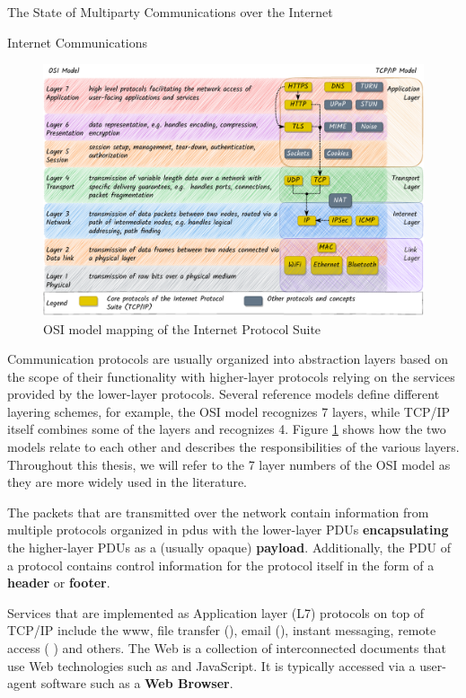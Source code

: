 \begin{frame}[fragile]{The State of Multiparty Communications over the Internet}
\begin{block}{Internet Communications}
\begin{figure}
\centering
\includegraphics[width=1\textwidth,height=\textheight]{thesis/../figures/osi-map-tcp.drawio.pdf}
\caption{OSI model mapping of the Internet Protocol Suite\label{osi-map-tcp}}
\end{figure}

Communication protocols are usually organized into abstraction layers based on the scope of their functionality with higher-layer protocols relying on the services provided by the lower-layer protocols. Several reference models define different layering schemes, for example, the OSI model recognizes 7 layers, while TCP/IP itself combines some of the layers and recognizes 4. Figure \ref{osi-map-tcp} shows how the two models relate to each other and describes the responsibilities of the various layers. Throughout this thesis, we will refer to the 7 layer numbers of the OSI model as they are more widely used in the literature.

The packets that are transmitted over the network contain information from multiple protocols organized in \glspl{pdu} with the lower-layer PDUs \textbf{encapsulating} the higher-layer PDUs as a (usually opaque) \textbf{payload}. Additionally, the PDU of a protocol contains control information for the protocol itself in the form of a \textbf{header} or \textbf{footer}.

Services that are implemented as Application layer (L7) protocols on top of TCP/IP include the \gls{www}, file transfer (), email (), instant messaging, remote access ( \autocite{sshRFC}) and others. The Web is a collection of interconnected documents that use Web technologies such as  and JavaScript. It is typically accessed via a user-agent software such as a \textbf{Web Browser}.


\end{block}
\end{frame}
